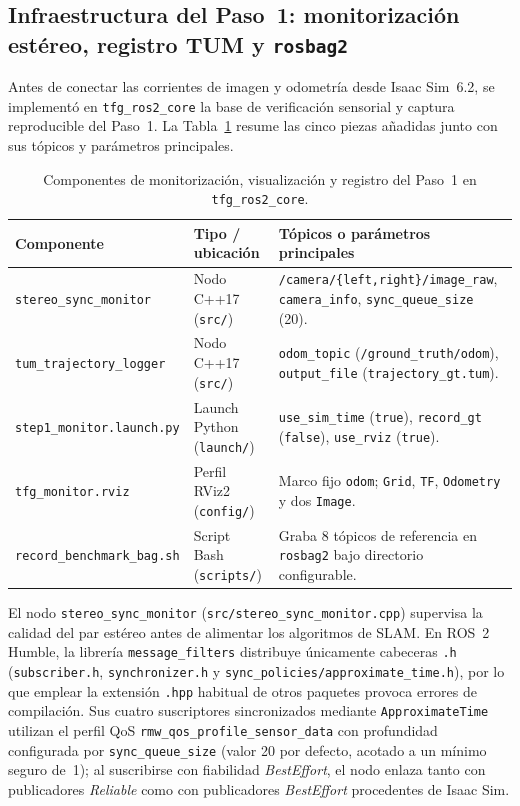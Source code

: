 \subsection{Infraestructura del Paso~1: monitorización estéreo, registro TUM y \texttt{rosbag2}}
\label{sec:infraestructura_paso1}

Antes de conectar las corrientes de imagen y odometría desde Isaac Sim~6.2, se implementó en \texttt{tfg\_ros2\_core} la base de verificación sensorial y captura reproducible del Paso~1. La Tabla~\ref{tab:componentes_paso1} resume las cinco piezas añadidas junto con sus tópicos y parámetros principales.

\begin{table}[htbp]
  \centering
  \caption{Componentes de monitorización, visualización y registro del Paso~1 en \texttt{tfg\_ros2\_core}.}
  \label{tab:componentes_paso1}
  \begin{tabular}{llp{5.6cm}}
    \toprule
    Componente & Tipo / ubicación & Tópicos o parámetros principales \\
    \midrule
    \texttt{stereo\_sync\_monitor} & Nodo C++17 (\texttt{src/}) & \texttt{/camera/\{left,right\}/image\_raw}, \texttt{camera\_info}, \texttt{sync\_queue\_size} (\num{20}). \\
    \texttt{tum\_trajectory\_logger} & Nodo C++17 (\texttt{src/}) & \texttt{odom\_topic} (\texttt{/ground\_truth/odom}), \texttt{output\_file} (\texttt{trajectory\_gt.tum}). \\
    \texttt{step1\_monitor.launch.py} & Launch Python (\texttt{launch/}) & \texttt{use\_sim\_time} (\texttt{true}), \texttt{record\_gt} (\texttt{false}), \texttt{use\_rviz} (\texttt{true}). \\
    \texttt{tfg\_monitor.rviz} & Perfil RViz2 (\texttt{config/}) & Marco fijo \texttt{odom}; \texttt{Grid}, \texttt{TF}, \texttt{Odometry} y dos \texttt{Image}. \\
    \texttt{record\_benchmark\_bag.sh} & Script Bash (\texttt{scripts/}) & Graba \num{8} tópicos de referencia en \texttt{rosbag2} bajo directorio configurable. \\
    \bottomrule
  \end{tabular}
\end{table}

El nodo \texttt{stereo\_sync\_monitor} (\texttt{src/stereo\_sync\_monitor.cpp}) supervisa la calidad del par estéreo antes de alimentar los algoritmos de SLAM. En ROS~2 Humble, la librería \texttt{message\_filters} distribuye únicamente cabeceras \texttt{.h} (\texttt{subscriber.h}, \texttt{synchronizer.h} y \texttt{sync\_policies/approximate\_time.h}), por lo que emplear la extensión \texttt{.hpp} habitual de otros paquetes provoca errores de compilación. Sus cuatro suscriptores sincronizados mediante \texttt{ApproximateTime} utilizan el perfil QoS \texttt{rmw\_qos\_profile\_sensor\_data} con profundidad configurada por \texttt{sync\_queue\_size} (valor \num{20} por defecto, acotado a un mínimo seguro de~\num{1}); al suscribirse con fiabilidad \textit{BestEffort}, el nodo enlaza tanto con publicadores \textit{Reliable} como con publicadores \textit{BestEffort} procedentes de Isaac Sim.

